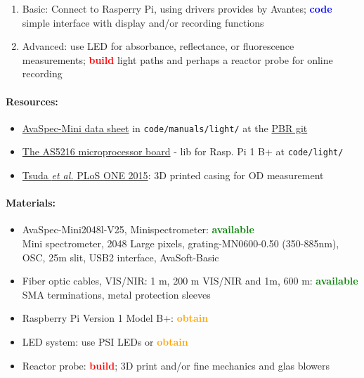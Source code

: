 \documentclass[12pt,a4paper]{scrartcl}
\newcommand{\git}[0]{\href{https://git.hhu.de/machne/pbr_hackathon_201503}{PBR git}}
\newcommand{\obtain}[0]{\textcolor{orange}{\textbf{obtain}}}
\newcommand{\avail}[0]{\textcolor{green}{\textbf{available}}}
\newcommand{\build}[0]{\textcolor{red}{\textbf{build}}}
\newcommand{\code}[0]{\textcolor{blue}{\textbf{code}}}
\begin{document}
\begin{enumerate}
\item Basic: Connect to Rasperry Pi, using drivers provides by
  Avantes; \code{} simple interface with display and/or recording
  functions
\item Advanced: use LED for absorbance, reflectance, or fluorescence
  measurements; \build{} light paths and perhaps a reactor probe for
  online recording
\end{enumerate}


\paragraph{Resources:}
\begin{itemize}
\item
  \href{http://www.avantes.com/images/productsheets/AvaSpec_Mini5.pdf}{AvaSpec-Mini
    data sheet} in \texttt{code/manuals/light/} at the \git{}
\item \href{http://www.avantes.com/products/oem/item/220-oem-spectrometers-as5216-microprocessor-board}{The AS5216 microprocessor board} - lib for Rasp. Pi 1 B+ at \texttt{code/light/}
\item \href{http://www.ncbi.nlm.nih.gov/pmc/articles/PMC4641590/}{Tsuda
    \textit{et al.} PLoS ONE 2015}: 3D printed casing for OD measurement
\end{itemize}

\paragraph{Materials:}
\begin{itemize}
\item AvaSpec-Mini2048l-V25, Minispectrometer: \avail{}\\ Mini
  spectrometer, 2048 Large pixels, grating-MN0600-0.50 (350-885nm),
  OSC, 25\textmu{}m slit, USB2 interface, AvaSoft-Basic
\item Fiber optic cables, VIS/NIR: 1 m, 200 \textmu{}m VIS/NIR and 1m,
  600 \textmu{}m: \avail{}\\
  SMA terminations, metal protection sleeves
\item Raspberry Pi Version 1 Model B+: \obtain{}
\item LED system: use PSI LEDs or \obtain{}
\item Reactor probe: \build{}; 3D print and/or fine mechanics and glas
  blowers
\end{itemize}
\end{document}
